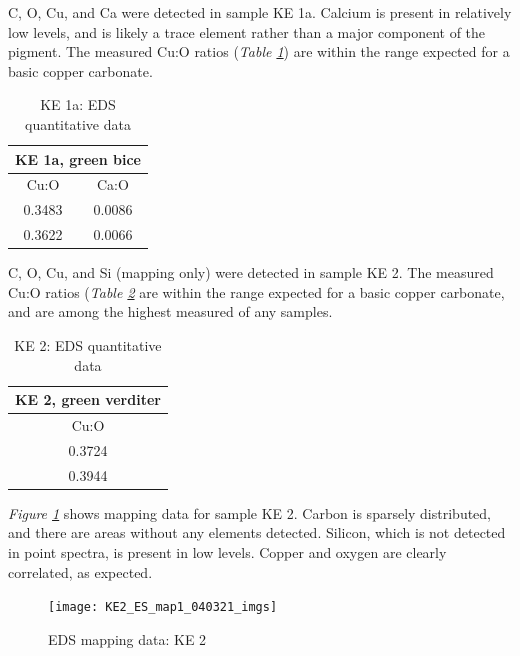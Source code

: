 
C, O, Cu, and Ca were detected in sample KE 1a. Calcium is present in relatively low levels, and is likely a trace element rather than a major component of the pigment. The measured Cu:O ratios (\textit{Table \ref{table:ke1a_ratios}}) are within the range expected for a basic copper carbonate.

\begin{table}[H]
\caption{KE 1a: EDS quantitative data}
\centering
\label{table:ke1a_ratios}
\begin{tabular}{c c}
\toprule
\multicolumn{2}{c}{KE 1a, green bice} \\
\midrule
Cu:O & Ca:O \\
\midrule
0.3483 & 0.0086 \\
0.3622 & 0.0066 \\
\bottomrule
\end{tabular}
\end{table}


C, O, Cu, and Si (mapping only) were detected in sample KE 2. The measured Cu:O ratios (\textit{Table \ref{table:ke2_ratios}} are within the range expected for a basic copper carbonate, and are among the highest measured of any samples.

\begin{table}[H]
\caption{KE 2: EDS quantitative data}
\centering
\label{table:ke2_ratios}
\begin{tabular}{c}
\toprule
KE 2, green verditer \\
\midrule
Cu:O \\
\midrule
0.3724 \\
0.3944 \\
\bottomrule
\end{tabular}
\end{table}

\textit{Figure \ref{fig:ke2_map1}} shows mapping data for sample KE 2. Carbon is sparsely distributed, and there are areas without any elements detected. Silicon, which is not detected in point spectra, is present in low levels. Copper and oxygen are clearly correlated, as expected.

\begin{figure}[H]
\centering
  \texttt{[image: KE2\_ES\_map1\_040321\_imgs]}
\caption[EDS mapping data: KE 2]{EDS mapping data: KE 2}
\label{fig:ke2_map1}
\end{figure}


